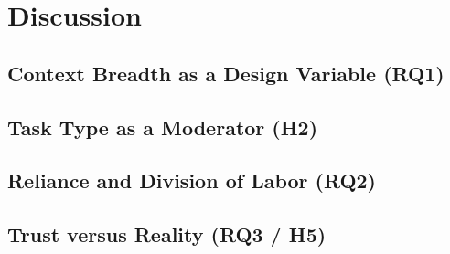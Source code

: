 \section{Discussion}
\label{sec:discussion}


\subsection{Context Breadth as a Design Variable (RQ1)}
\label{sec:discussion:breadth}


\subsection{Task Type as a Moderator (H2)}
\label{sec:discussion:tasktype}


\subsection{Reliance and Division of Labor (RQ2)}
\label{sec:discussion:reliance}


\subsection{Trust versus Reality (RQ3 / H5)}
\label{sec:discussion:trust}


